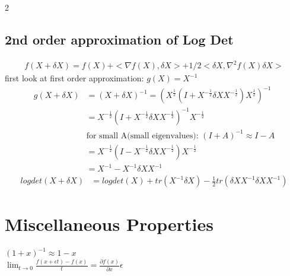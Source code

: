 \documentclass[8pt]{extarticle}
\newcommand{\ppartial}[2]{\frac{\partial #1}{\partial #2}}
\begin{document}
\begin{multicols*}{2}
  \subsection{2nd order approximation of Log Det}
  \begin{align*}
    f(X+\delta X) = f(X) + <\nabla f(X), \delta X>  + 1/2 <\delta X, \nabla^2 f(X) \delta X>
  \end{align*}
  first look at first order approximation: $g(X) = X^{-1}$
  \begin{align*}
    g(X+\delta X) &= (X+\delta X)^{-1} = (X^{\frac{1}{2}}(I+X^{-\frac{1}{2}} \delta X X^{-\frac{1}{2}}) X^{\frac{1}{2}})^{-1}\\
                  &= X^{-\frac{1}{2}}(I+X^{-\frac{1}{2}} \delta X X^{-\frac{1}{2}})^{-1} X^{-\frac{1}{2}}\\
                  &\text{for small A(small eigenvalues): } (I+A)^{-1} \approx I-A\\
                  &= X^{-\frac{1}{2}}(I-X^{-\frac{1}{2}} \delta X X^{-\frac{1}{2}}) X^{-\frac{1}{2}}\\
                  &= X^{-1} - X^{-1} \delta X X^{-1}
  \end{align*}
  \begin{align*}
    logdet(X+\delta X)&=logdet(X)+tr(X^{-1}\delta X) - \frac{1}{2} tr(\delta X X^{-1} \delta X X^{-1})
  \end{align*}
  
  \pagebreak
  
  \section{Miscellaneous Properties}
  $(1+x)^{-1} \approx 1-x$\\
  $\lim_{t \to 0} \frac{f(x+\epsilon t) - f(x)}{t} = \ppartial{f(x)}{x} \epsilon$\\


\end{multicols*}
\end{document}
